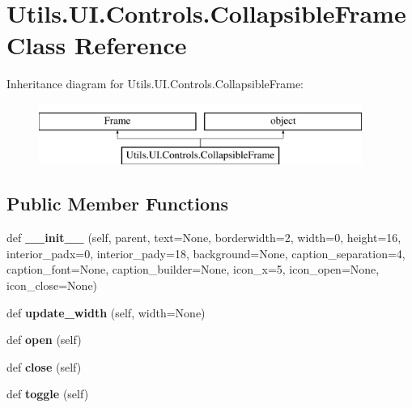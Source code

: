 \hypertarget{class_c_utils_1_1_utils_1_1_u_i_1_1_controls_1_1_collapsible_frame}{}\section{Utils.\+U\+I.\+Controls.\+Collapsible\+Frame Class Reference}
\label{class_c_utils_1_1_utils_1_1_u_i_1_1_controls_1_1_collapsible_frame}
Inheritance diagram for Utils.\+U\+I.\+Controls.\+Collapsible\+Frame\+:\begin{figure}[H]
\begin{center}
\leavevmode
\includegraphics[height=2.000000cm]{class_c_utils_1_1_utils_1_1_u_i_1_1_controls_1_1_collapsible_frame}
\end{center}
\end{figure}
\subsection*{Public Member Functions}
\begin{DoxyCompactItemize}
\item 
\mbox{\label{class_c_utils_1_1_utils_1_1_u_i_1_1_controls_1_1_collapsible_frame_a1fd54cca44098011a765116d40fc7fb1}} 
def {\bfseries \+\_\+\+\_\+init\+\_\+\+\_\+} (self, parent, text=None, borderwidth=2, width=0, height=16, interior\+\_\+padx=0, interior\+\_\+pady=18, background=None, caption\+\_\+separation=4, caption\+\_\+font=None, caption\+\_\+builder=None, icon\+\_\+x=5, icon\+\_\+open=None, icon\+\_\+close=None)
\item 
\mbox{\label{class_c_utils_1_1_utils_1_1_u_i_1_1_controls_1_1_collapsible_frame_a4c1b4bd22aaabcfad76aad6823c25087}} 
def {\bfseries update\+\_\+width} (self, width=None)
\item 
\mbox{\label{class_c_utils_1_1_utils_1_1_u_i_1_1_controls_1_1_collapsible_frame_a6a7ca114eeea12e38e719a070358ae14}} 
def {\bfseries open} (self)
\item 
\mbox{\label{class_c_utils_1_1_utils_1_1_u_i_1_1_controls_1_1_collapsible_frame_a8639372c33e15084a7f7c4d9d87b7bfe}} 
def {\bfseries close} (self)
\item 
\mbox{\label{class_c_utils_1_1_utils_1_1_u_i_1_1_controls_1_1_collapsible_frame_a76ef2ebd71b1a1858194134725b6c800}} 
def {\bfseries toggle} (self)
\end{DoxyCompactItemize}
